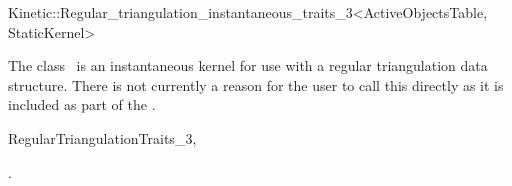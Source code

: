 

\begin{ccRefClass}{Kinetic::Regular_triangulation_instantaneous_traits_3<ActiveObjectsTable, StaticKernel>}  %


\ccDefinition
  
The class \ccRefName\ is an instantaneous kernel for use with a
regular triangulation data structure. There is not currently a reason
for the user to call this directly as it is included as part of the
.


\ccIsModel

RegularTriangulationTraits\_3, 

\ccSeeAlso

.

\end{ccRefClass}


